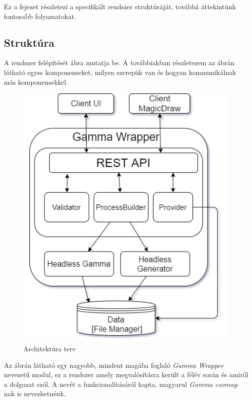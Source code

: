 Ez a fejezet részletezi a specifikált rendszer struktúráját, továbbá áttekintünk fontosabb folyamatokat.
\subsection{Struktúra}

A rendszer felépítését  ábra mutatja be. A továbbiakban részletezem az ábrán látható egyes komponenseket, milyen szerepük van és hogyan kommunikálnak más komponensekkel.
\begin{figure}[!ht]
	\centering
	\includegraphics[height=135mm,keepaspectratio]{figures/architecture.png}
	\caption{Architektúra terv}
	\label{fig:structure}
\end{figure}
Az ábrán látható egy nagyobb, mindent magába foglaló \textit{Gamma Wrapper} nevezetű modul, ez a rendszer amely megvalósításra került a félév során és amiről a dolgozat szól. A nevét a funkcionalitásáról kapta, magyarul \textit{Gamma csomag}-nak is nevezhetnénk.

